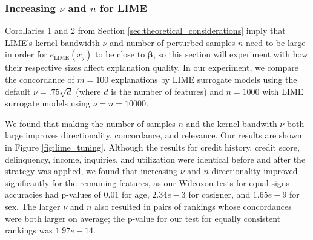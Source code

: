 \documentclass[mnsc,blindrev]{informs3}
\begin{document}
        \subsubsection{Increasing $\nu$ and $n$ for LIME } 
            \label{sec:lime_params}
            Corollaries 1 and 2 from Section \ref{sec:theoretical_considerations} imply that LIME's kernel bandwidth $\nu$ and number of perturbed samples $n$ need to be large in order for $e_{\text{LIME}}(x_j)$ to be close to $\boldsymbol{\beta}$, so this section will experiment with how their respective sizes affect explanation quality. In our experiment, we compare the concordance of $m=100$ explanations by LIME surrogate models using the default $\nu = .75\sqrt{d}$ (where $d$ is the number of features) and $n=1000$ with LIME surrogate models using $\nu=n=10000$. 
            
            We found that making the number of samples $n$ and the kernel bandwith $\nu$ both large improves directionality, concordance, and relevance. Our results are shown in Figure \ref{fig:lime_tuning}. Although the results for credit history, credit score, delinquency, income, inquiries, and utilization were identical before and after the strategy was applied, we found that increasing $\nu$ and $n$ directionality improved significantly for the remaining features, as our Wilcoxon tests for equal signs accuracies had p-values of $0.01$ for age, $2.34e-3$ for cosigner, and $1.65e-9$ for sex. The larger $\nu$ and $n$ also resulted in pairs of rankings whose concordances were both larger on average; the p-value for our test for equally consistent rankings was $1.97e-14$. %
        
\end{document}

